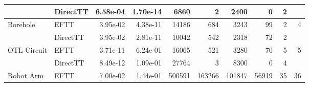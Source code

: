 \begin{table}[!ht]
{\begin{tabular}{llrrrrrrrr}
                                           & DirectTT                        & 6.58e-04                    & 1.70e-14                                           & 6860                           & 2                                                   & 2400                          & 0                                                & 2                                        & {}                                       \\ \hline
            \multirow{2}{*}{Borehole}      & EFTT                            & 3.95e-02                    & 4.38e-11                                           & 14186                          & 684                                                 & 3243                          & 99                                               & 2                                        & {4}                                      \\ %
                                           & DirectTT                        & 3.95e-02                    & 2.81e-11                                           & 10042                          & 542                                                 & 2318                          & 72                                               & 2                                        & {}                                       \\ \hline
            \multirow{2}{*}{OTL Circuit}   & EFTT                            & 3.71e-11                    & 6.24e-01                                           & 16065                          & 521                                                 & 3280                          & 70                                               & 5                                        & {5}                                      \\ %
                                           & DirectTT                        & 8.49e-12                    & 1.09e-01                                           & 27764                          & 3                                                   & 8300                          & 0                                                & 4                                        & {}                                       \\ \hline
            \multirow{2}{*}{Robot Arm}     & EFTT                            & 7.00e-02                    & 1.44e-01                                           & 500591                         & 163266                                              & 101847                        & 56919                                            & 35                                       & {36}                                     \\ %

\end{tabular}}
\end{table}
